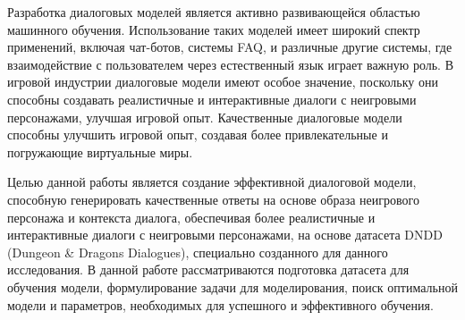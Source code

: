 
Разработка диалоговых моделей является активно развивающейся областью машинного обучения. Использование таких моделей имеет широкий спектр применений, включая чат-ботов, системы FAQ, и различные другие системы, где взаимодействие с пользователем через естественный язык играет важную роль. В игровой индустрии диалоговые модели имеют особое значение, поскольку они способны создавать реалистичные и интерактивные диалоги с неигровыми персонажами, улучшая игровой опыт. Качественные диалоговые модели способны улучшить игровой опыт, создавая более привлекательные и погружающие виртуальные миры.

Целью данной работы является создание эффективной диалоговой модели, способную генерировать качественные ответы на основе образа неигрового персонажа и контекста диалога, обеспечивая более реалистичные и интерактивные диалоги с неигровыми персонажами, на основе датасета DNDD (Dungeon \& Dragons Dialogues), специально созданного для данного исследования. В данной работе рассматриваются подготовка датасета для обучения модели, формулирование задачи для моделирования, поиск оптимальной модели и параметров, необходимых для успешного и эффективного обучения.